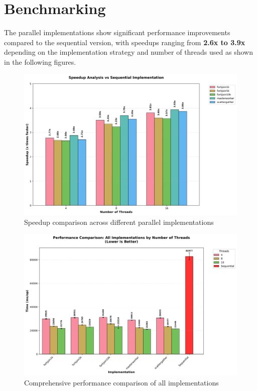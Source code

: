 \chapter{Benchmarking}\label{cap:benchmarking}

The parallel implementations show significant performance improvements compared to the sequential version, with speedups ranging from \textbf{2.6x to 3.9x} depending on the implementation strategy and number of threads used as shown in the following figures.

\begin{figure}[htbp]
   \centering
    \includegraphics[width=\textwidth]{images/speedup_analysis.png}
    \caption{Speedup comparison across different parallel implementations}
    \label{fig:speedup}
\end{figure}

\begin{figure}[htbp]
   \centering
   \includegraphics[width=\textwidth]{images/performance_comparison.png}
   \caption{Comprehensive performance comparison of all implementations}
   \label{fig:performance}
\end{figure}

